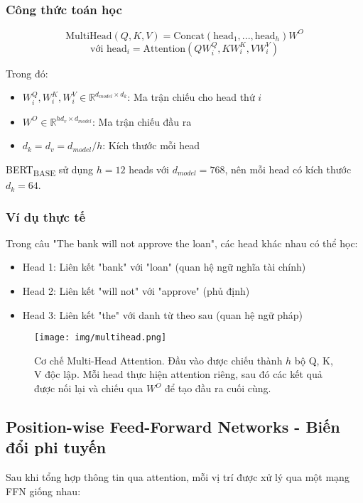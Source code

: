 \subsubsection{Công thức toán học}
$$ \text{MultiHead}(Q, K, V) = \text{Concat}(\text{head}_1, ..., \text{head}_h)W^O $$
$$ \text{với } \text{head}_i = \text{Attention}(QW_i^Q, KW_i^K, VW_i^V) $$

Trong đó:
\begin{itemize}
    \item $W_i^Q, W_i^K, W_i^V \in \mathbb{R}^{d_{model} \times d_k}$: Ma trận chiếu cho head thứ $i$
    \item $W^O \in \mathbb{R}^{hd_v \times d_{model}}$: Ma trận chiếu đầu ra
    \item $d_k = d_v = d_{model}/h$: Kích thước mỗi head
\end{itemize}

BERT\textsubscript{BASE} sử dụng $h=12$ heads với $d_{model}=768$, nên mỗi head có kích thước $d_k=64$.

\subsubsection{Ví dụ thực tế}
Trong câu "The bank will not approve the loan", các head khác nhau có thể học:
\begin{itemize}
    \item Head 1: Liên kết "bank" với "loan" (quan hệ ngữ nghĩa tài chính)
    \item Head 2: Liên kết "will not" với "approve" (phủ định)
    \item Head 3: Liên kết "the" với danh từ theo sau (quan hệ ngữ pháp)
\end{itemize}

\begin{figure}[H]
    \centering
    \texttt{[image: img/multihead.png]}
    \caption{Cơ chế Multi-Head Attention. Đầu vào được chiếu thành $h$ bộ Q, K, V độc lập. Mỗi head thực hiện attention riêng, sau đó các kết quả được nối lại và chiếu qua $W^O$ để tạo đầu ra cuối cùng.}
    \label{fig:multi_head_attention}
\end{figure}

\subsection{Position-wise Feed-Forward Networks - Biến đổi phi tuyến}
\label{ssec:feed_forward_networks}
Sau khi tổng hợp thông tin qua attention, mỗi vị trí được xử lý qua một mạng FFN giống nhau:

